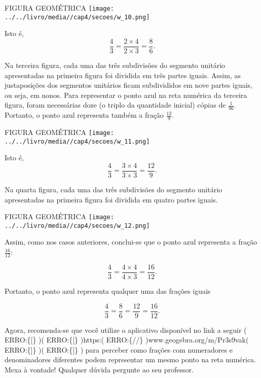 \documentclass[a4,12pt]{book}
\begin{document}
\begin{imagem*}[breakable]{}{}   FIGURA GEOMÉTRICA  
    \texttt{[image: ../../livro/media//cap4/secoes/w\_10.png]}  
\end{imagem*}

Isto é,
$$\dfrac{4}{3} = \dfrac{2 \times 4}{2 \times 3} = \dfrac{8}{6}.$$

Na terceira figura, cada uma das três subdivisões do segmento unitário apresentadas na primeira figura foi dividida em três partes iguais. Assim, as justaposições dos segmentos unitários ficam subdivididos em nove partes iguais, ou seja, em nonos. Para representar o ponto azul na reta numérica da terceira figura, foram necessárias doze (o triplo da quantidade inicial) cópias de $\frac{1}{96}$. Portanto, o ponto azul representa também a fração $\frac{12}{9}$.

\begin{imagem*}[breakable]{}{}   FIGURA GEOMÉTRICA  
    \texttt{[image: ../../livro/media//cap4/secoes/w\_11.png]}  
\end{imagem*}

Isto é, 
$$\dfrac{4}{3} = \dfrac{3 \times 4}{3 \times 3} = \dfrac{12}{9}.$$

Na quarta figura, cada uma das três subdivisões do segmento unitário apresentadas na primeira figura foi dividida em quatro partes iguais.

\begin{imagem*}[breakable]{}{}   FIGURA GEOMÉTRICA  
    \texttt{[image: ../../livro/media//cap4/secoes/w\_12.png]}  
\end{imagem*}

Assim, como nos casos anteriores, conclui-se que o ponto azul representa a fração $\frac{16}{12}$:

$$\dfrac{4}{3} = \dfrac{4 \times 4}{4 \times 3} = \dfrac{16}{12}.$$

Portanto, o ponto azul representa qualquer uma das frações iguais

$$\dfrac{4}{3} = \dfrac{8}{6} = \dfrac{12}{9} = \dfrac{16}{12}.$$

Agora, recomenda-se que você utilize o aplicativo disponível no link a seguir ( ERRO:\{[\} )( ERRO:\{[\} )https:( ERRO:\{//\} )www.geogebra.org/m/Pr3s9vak( ERRO:\{]\} )( ERRO:\{]\} ) para perceber como frações com numeradores e denominadores diferentes podem representar um mesmo ponto  na reta numérica. Mexa à vontade! Qualquer dúvida pergunte ao seu professor.
\end{document}
